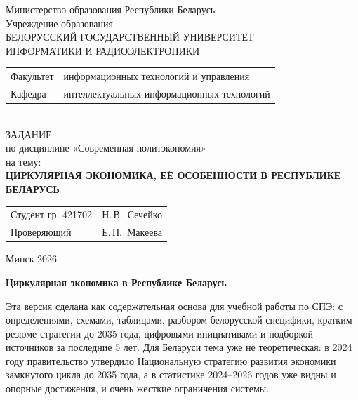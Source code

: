 \documentclass[14pt,a4paper]{extarticle}
\begin{document}
\begin{titlepage}
  \begin{center}
    Министерство образования Республики Беларусь\\[1em]
    Учреждение образования\\
    БЕЛОРУССКИЙ ГОСУДАРСТВЕННЫЙ УНИВЕРСИТЕТ \\
    ИНФОРМАТИКИ И РАДИОЭЛЕКТРОНИКИ\\[1em]

    \begin{minipage}{\textwidth}
      \begin{flushleft}
        \begin{tabular}{ l l }
          Факультет & информационных технологий и управления\\
          Кафедра   & интеллектуальных информационных технологий
        \end{tabular}
      \end{flushleft}
    \end{minipage}\\[1em]

    {ЗАДАНИЕ}\\
    {по дисциплине «Современная политэкономия»}\\
    {на тему:}\\[1em]
    \textbf{\large ЦИРКУЛЯРНАЯ ЭКОНОМИКА, ЕЁ ОСОБЕННОСТИ В РЕСПУБЛИКЕ БЕЛАРУСЬ}\\[1em]

    \vspace{2em}
    \begin{tabular}{ p{}p{} }
      Студент гр. 421702 & Н.\,В.~Сечейко \\
      Проверяющий & Е.\,Н.~Макеева \\
    \end{tabular}
    
    \vfill
    {\normalsize Минск 2026}
  \end{center}
\end{titlepage}

\textbf{Циркулярная экономика в Республике Беларусь}

Эта версия сделана как содержательная основа для учебной работы по СПЭ: с определениями, схемами, таблицами, разбором белорусской специфики, кратким резюме стратегии до 2035 года, цифровыми инициативами и подборкой источников за последние 5 лет. Для Беларуси тема уже не теоретическая: в 2024 году правительство утвердило Национальную стратегию развития экономики замкнутого цикла до 2035 года, а в статистике 2024--2026 годов уже видны и опорные достижения, и очень жесткие ограничения системы.
\end{document}
